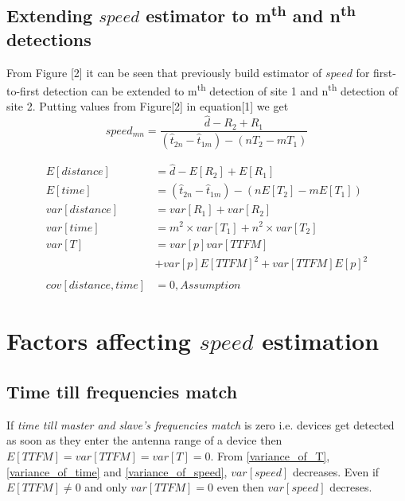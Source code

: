 \documentclass[10pt,twocolumn,letterpaper]{article}
\begin{document}
\subsection{Extending $speed$ estimator to m\textsuperscript{\textbf{th}} and n\textsuperscript{\textbf{th}} detections }
From Figure [2] it can be seen that previously build estimator of $speed$ for first-to-first detection can be extended to m\textsuperscript{th} detection of site 1 and n\textsuperscript{th} detection of site 2. Putting values from Figure[2] in equation[1] we get
\begin{equation}
   speed_{mn} = \frac{ \hat{d} - R_2 + R_1 }{ (\hat{t}_{2n} - \hat{t}_{1m} ) - ( nT_2 - mT_1 ) }  
\end{equation}

\begin{subequations}
\begin{align}
   \label{expected_value_of_distance}
   E[distance] &= \hat{d} - E[R_2] + E[R_1] \\
   \label{expected_value_of_time}
   E[time] &= ( \hat{t}_{2n} - \hat{t}_{1m} ) - ( nE[T_2] - mE[T_1] ) \\
   \label{variance_of_distance}
   var[distance] &= var[R_1] + var[R_2] \\
   \label{variance_of_time}
   var[time] &= m^2 \times var[T_1] + n^2 \times var[T_2] \\
   \label{variance_of_T}
   var[T] &= var[p] var[TTFM] \\
   &+ var[p] E[TTFM]^2 + var[TTFM] E[p]^2  \\
   \label{cov_dist_time} \\
   cov[distance, time] &= 0, Assumption
\end{align}
\end{subequations}

\section{Factors affecting $speed$ estimation}

\subsection{Time till frequencies match}
If \textit{time till master and slave's frequencies match} is zero i.e. devices get detected as soon as they enter the antenna range of a device then \( E[TTFM] = var[TTFM] = var[T] = 0 \). From \ref{variance_of_T}, \ref{variance_of_time} and \ref{variance_of_speed}, $var[speed]$ decreases. Even if \( E[TTFM] \neq 0 \) and only \( var[TTFM] = 0 \) even then \(var[speed]\) decreses.
\end{document}
